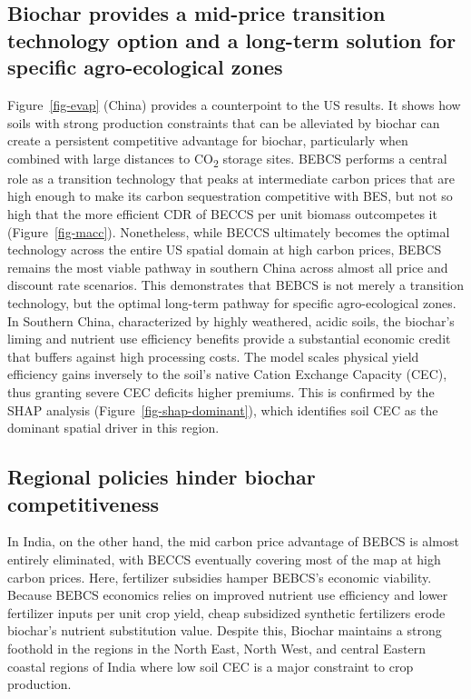 \documentclass[
  letterpaper,
]{article}
\begin{document}
\subsection{Biochar provides a mid-price transition technology option
and a long-term solution for specific agro-ecological
zones}\label{biochar-provides-a-mid-price-transition-technology-option-and-a-long-term-solution-for-specific-agro-ecological-zones}

Figure~\ref{fig-evap} (China) provides a counterpoint to the US results.
It shows how soils with strong production constraints that can be
alleviated by biochar can create a persistent competitive advantage for
biochar, particularly when combined with large distances to
CO\textsubscript{2} storage sites. BEBCS performs a central role as a
transition technology that peaks at intermediate carbon prices that are
high enough to make its carbon sequestration competitive with BES, but
not so high that the more efficient CDR of BECCS per unit biomass
outcompetes it (Figure~\ref{fig-macc}). Nonetheless, while BECCS
ultimately becomes the optimal technology across the entire US spatial
domain at high carbon prices, BEBCS remains the most viable pathway in
southern China across almost all price and discount rate scenarios. This
demonstrates that BEBCS is not merely a transition technology, but the
optimal long-term pathway for specific agro-ecological zones. In
Southern China, characterized by highly weathered, acidic soils, the
biochar's liming and nutrient use efficiency benefits provide a
substantial economic credit that buffers against high processing costs.
The model scales physical yield efficiency gains inversely to the soil's
native Cation Exchange Capacity (CEC), thus granting severe CEC deficits
higher premiums. This is confirmed by the SHAP analysis
(Figure~\ref{fig-shap-dominant}), which identifies soil CEC as the
dominant spatial driver in this region.

\subsection{Regional policies hinder biochar
competitiveness}\label{regional-policies-hinder-biochar-competitiveness}

In India, on the other hand, the mid carbon price advantage of BEBCS is
almost entirely eliminated, with BECCS eventually covering most of the
map at high carbon prices. Here, fertilizer subsidies hamper BEBCS's
economic viability. Because BEBCS economics relies on improved nutrient
use efficiency and lower fertilizer inputs per unit crop yield, cheap
subsidized synthetic fertilizers erode biochar's nutrient substitution
value. Despite this, Biochar maintains a strong foothold in the regions
in the North East, North West, and central Eastern coastal regions of
India where low soil CEC is a major constraint to crop production.
\end{document}
